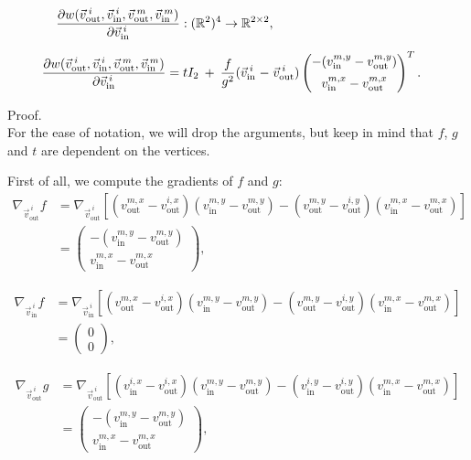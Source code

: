 \begin{proposition}
	\begin{align}
		\begin{split}
			\dfrac{\partial w(\vec{v}_{\text{out}}^{\: i}, \vec{v}_{\text{in}}^{\: i}, \vec{v}_{\text{out}}^{\: m}, \vec{v}_{\text{in}}^{\: m})}{\partial \vec{v}_{\text{in}}^{\: i}}: (\mathbb{R}^2)^4 \rightarrow \mathbb{R}^{2 \times 2}, \\[0.5em]
			\dfrac{\partial w(\vec{v}_{\text{out}}^{\: i}, \vec{v}_{\text{in}}^{\: i}, \vec{v}_{\text{out}}^{\: m}, \vec{v}_{\text{in}}^{\: m})}{\partial \vec{v}_{\text{in}}^{\: i}} = t I_2 \:+\: \dfrac{f}{g^2}(\vec{v}_{\text{in}}^{\: i} \;-\; &\vec{v}_{\text{out}}^{\: i}) \begin{pmatrix}
			-(v_{\text{in}}^{m, y} - v_{\text{out}}^{m, y}) \\[0.5em]
			 v_{\text{in}}^{m, x} - v_{\text{out}}^{m, x}
		\end{pmatrix}^T.
		\end{split}
		\label{equ:dwv_in}
	\end{align}

	Proof.\\

	For the ease of notation, we will drop the arguments, but keep in mind that $f$, $g$ and $t$ are dependent on the vertices. 

	First of all, we compute the gradients of $f$ and $g$: 
	\begin{align*}
		\nabla_{\vec{v}_{\text{out}}^{\: i}} f 
		&= \nabla_{\vec{v}_{\text{out}}^{\: i}}[(v_{\text{out}}^{m, x} - v_{\text{out}}^{i, x})(v_{\text{in}}^{m, y} - v_{\text{out}}^{m, y}) - (v_{\text{out}}^{m, y} - v_{\text{out}}^{i, y})(v_{\text{in}}^{m, x} - v_{\text{out}}^{m, x})] \\[0.5em]
		&= \begin{pmatrix}
			-(v_{\text{in}}^{m, y} - v_{\text{out}}^{m, y}) \\[0.5em]
			 v_{\text{in}}^{m, x} - v_{\text{out}}^{m, x}
		\end{pmatrix}, 
	\end{align*}

	\begin{align*}
		\nabla_{\vec{v}_{\text{in}}^{\: i}} f 
		&= \nabla_{\vec{v}_{\text{in}}^{\: i}}[(v_{\text{out}}^{m, x} - v_{\text{out}}^{i, x})(v_{\text{in}}^{m, y} - v_{\text{out}}^{m, y}) - (v_{\text{out}}^{m, y} - v_{\text{out}}^{i, y})(v_{\text{in}}^{m, x} - v_{\text{out}}^{m, x})] \\[0.5em]
		&= \begin{pmatrix}
			0 \\
			0
		\end{pmatrix}, 
	\end{align*}

	\begin{align*}
		\nabla_{\vec{v}_{\text{out}}^{\: i}} g
		&= \nabla_{\vec{v}_{\text{out}}^{\: i}}[(v_{\text{in}}^{i, x} - v_{\text{out}}^{i, x})(v_{\text{in}}^{m, y} - v_{\text{out}}^{m, y}) - (v_{\text{in}}^{i, y} - v_{\text{out}}^{i, y})(v_{\text{in}}^{m, x} - v_{\text{out}}^{m, x})] \\[0.5em]
		&= \begin{pmatrix}
			-(v_{\text{in}}^{m, y} - v_{\text{out}}^{m, y}) \\[0.5em]
			 v_{\text{in}}^{m, x} - v_{\text{out}}^{m, x}
		\end{pmatrix}, 
	\end{align*}


\end{proposition}
